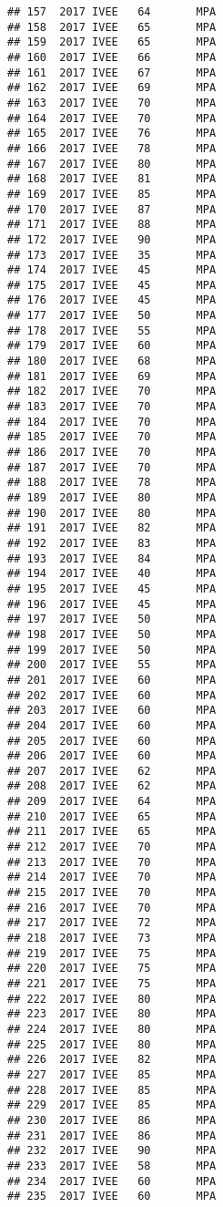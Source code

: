 \documentclass[]{article}
\begin{document}
\begin{verbatim}
## 157  2017 IVEE   64       MPA
## 158  2017 IVEE   65       MPA
## 159  2017 IVEE   65       MPA
## 160  2017 IVEE   66       MPA
## 161  2017 IVEE   67       MPA
## 162  2017 IVEE   69       MPA
## 163  2017 IVEE   70       MPA
## 164  2017 IVEE   70       MPA
## 165  2017 IVEE   76       MPA
## 166  2017 IVEE   78       MPA
## 167  2017 IVEE   80       MPA
## 168  2017 IVEE   81       MPA
## 169  2017 IVEE   85       MPA
## 170  2017 IVEE   87       MPA
## 171  2017 IVEE   88       MPA
## 172  2017 IVEE   90       MPA
## 173  2017 IVEE   35       MPA
## 174  2017 IVEE   45       MPA
## 175  2017 IVEE   45       MPA
## 176  2017 IVEE   45       MPA
## 177  2017 IVEE   50       MPA
## 178  2017 IVEE   55       MPA
## 179  2017 IVEE   60       MPA
## 180  2017 IVEE   68       MPA
## 181  2017 IVEE   69       MPA
## 182  2017 IVEE   70       MPA
## 183  2017 IVEE   70       MPA
## 184  2017 IVEE   70       MPA
## 185  2017 IVEE   70       MPA
## 186  2017 IVEE   70       MPA
## 187  2017 IVEE   70       MPA
## 188  2017 IVEE   78       MPA
## 189  2017 IVEE   80       MPA
## 190  2017 IVEE   80       MPA
## 191  2017 IVEE   82       MPA
## 192  2017 IVEE   83       MPA
## 193  2017 IVEE   84       MPA
## 194  2017 IVEE   40       MPA
## 195  2017 IVEE   45       MPA
## 196  2017 IVEE   45       MPA
## 197  2017 IVEE   50       MPA
## 198  2017 IVEE   50       MPA
## 199  2017 IVEE   50       MPA
## 200  2017 IVEE   55       MPA
## 201  2017 IVEE   60       MPA
## 202  2017 IVEE   60       MPA
## 203  2017 IVEE   60       MPA
## 204  2017 IVEE   60       MPA
## 205  2017 IVEE   60       MPA
## 206  2017 IVEE   60       MPA
## 207  2017 IVEE   62       MPA
## 208  2017 IVEE   62       MPA
## 209  2017 IVEE   64       MPA
## 210  2017 IVEE   65       MPA
## 211  2017 IVEE   65       MPA
## 212  2017 IVEE   70       MPA
## 213  2017 IVEE   70       MPA
## 214  2017 IVEE   70       MPA
## 215  2017 IVEE   70       MPA
## 216  2017 IVEE   70       MPA
## 217  2017 IVEE   72       MPA
## 218  2017 IVEE   73       MPA
## 219  2017 IVEE   75       MPA
## 220  2017 IVEE   75       MPA
## 221  2017 IVEE   75       MPA
## 222  2017 IVEE   80       MPA
## 223  2017 IVEE   80       MPA
## 224  2017 IVEE   80       MPA
## 225  2017 IVEE   80       MPA
## 226  2017 IVEE   82       MPA
## 227  2017 IVEE   85       MPA
## 228  2017 IVEE   85       MPA
## 229  2017 IVEE   85       MPA
## 230  2017 IVEE   86       MPA
## 231  2017 IVEE   86       MPA
## 232  2017 IVEE   90       MPA
## 233  2017 IVEE   58       MPA
## 234  2017 IVEE   60       MPA
## 235  2017 IVEE   60       MPA

\end{verbatim}
\end{document}
